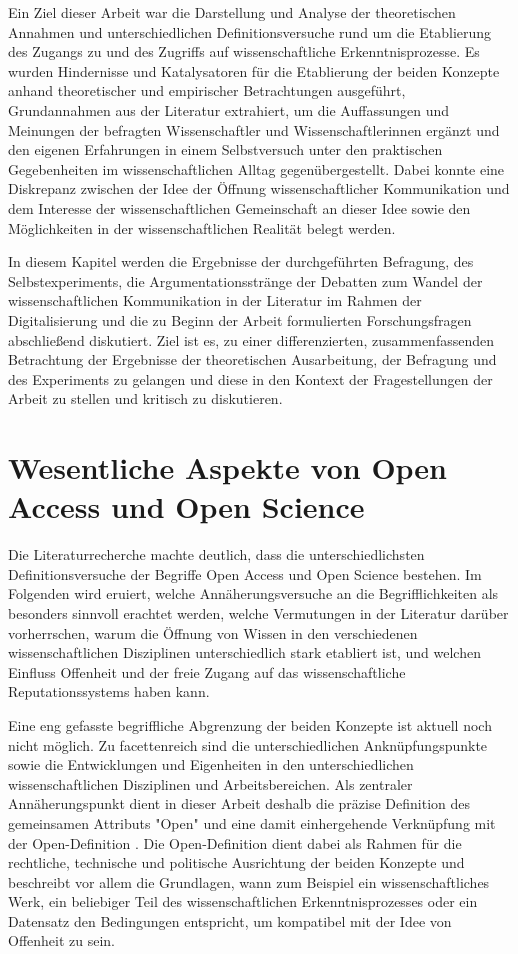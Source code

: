 Ein Ziel dieser Arbeit war die Darstellung und Analyse der theoretischen Annahmen und unterschiedlichen Definitionsversuche rund um die Etablierung des Zugangs zu und des Zugriffs auf wissenschaftliche Erkenntnisprozesse. Es wurden Hindernisse und Katalysatoren für die Etablierung der beiden Konzepte anhand theoretischer und empirischer Betrachtungen ausgeführt, Grundannahmen aus der Literatur extrahiert, um die Auffassungen und Meinungen der befragten Wissenschaftler und Wissenschaftlerinnen ergänzt und den eigenen Erfahrungen in einem Selbstversuch unter den praktischen Gegebenheiten im wissenschaftlichen Alltag gegenübergestellt. Dabei konnte eine Diskrepanz zwischen der Idee der Öffnung wissenschaftlicher Kommunikation und dem Interesse der wissenschaftlichen Gemeinschaft an dieser Idee sowie den Möglichkeiten in der wissenschaftlichen Realität belegt werden.

In diesem Kapitel werden die Ergebnisse der durchgeführten Befragung, des Selbstexperiments, die Argumentationsstränge der Debatten zum Wandel der wissenschaftlichen Kommunikation in der Literatur im Rahmen der Digitalisierung und die zu Beginn der Arbeit formulierten Forschungsfragen abschließend diskutiert. Ziel ist es, zu einer differenzierten, zusammenfassenden Betrachtung der Ergebnisse der theoretischen Ausarbeitung, der Befragung und des Experiments zu gelangen und diese in den Kontext der Fragestellungen der Arbeit zu stellen und kritisch zu diskutieren.

\section{Wesentliche Aspekte von Open Access und Open Science}

Die Literaturrecherche machte deutlich, dass die unterschiedlichsten Definitionsversuche der Begriffe Open Access und Open Science bestehen. Im Folgenden wird eruiert, welche Annäherungsversuche an die Begrifflichkeiten als besonders sinnvoll erachtet werden, welche Vermutungen in der Literatur darüber vorherrschen, warum die Öffnung von Wissen in den verschiedenen wissenschaftlichen Disziplinen unterschiedlich stark etabliert ist, und welchen Einfluss Offenheit und der freie Zugang auf das wissenschaftliche Reputationssystems haben kann.

Eine eng gefasste begriffliche Abgrenzung der beiden Konzepte ist aktuell noch nicht möglich. Zu facettenreich sind die unterschiedlichen Anknüpfungspunkte sowie die Entwicklungen und Eigenheiten in den unterschiedlichen wissenschaftlichen Disziplinen und Arbeitsbereichen. Als zentraler Annäherungspunkt dient in dieser Arbeit deshalb die präzise Definition des gemeinsamen Attributs "Open" und eine damit einhergehende Verknüpfung mit der Open-Definition \cite{Open_Definition_2014}. Die Open-Definition dient dabei als Rahmen für die rechtliche, technische und politische Ausrichtung der beiden Konzepte und beschreibt vor allem die Grundlagen, wann zum Beispiel ein wissenschaftliches Werk, ein beliebiger Teil des wissenschaftlichen Erkenntnisprozesses oder ein Datensatz den Bedingungen entspricht, um kompatibel mit der Idee von Offenheit zu sein.

